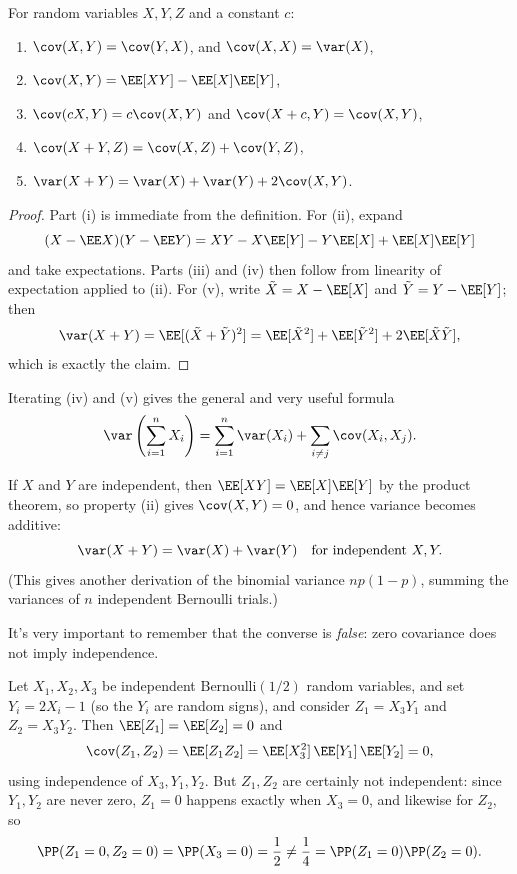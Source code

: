 \begin{proposition}
	For random variables $X, Y, Z$ and a constant $c$:
	\begin{enumerate}[label=(\roman*)]
		\item $\cov(X, Y) = \cov(Y, X)$, and $\cov(X, X) = \var(X)$,
		\item $\cov(X, Y) = \EE[XY] - \EE[X]\EE[Y]$,
		\item $\cov(cX, Y) = c\cov(X, Y)$ and $\cov(X + c, Y) = \cov(X, Y)$,
		\item $\cov(X + Y, Z) = \cov(X, Z) + \cov(Y, Z)$,
		\item $\var(X + Y) = \var(X) + \var(Y) + 2\cov(X, Y)$.
	\end{enumerate}
\end{proposition}
\begin{proof}
	Part (i) is immediate from the definition. For (ii), expand
	$$
	(X - \EE X)(Y - \EE Y) = XY - X \EE[Y] - Y \EE[X] + \EE[X]\EE[Y]
	$$
	and take expectations. Parts (iii) and (iv) then follow from linearity of expectation applied to (ii). For (v), write $\tilde{X} = X - \EE[X]$ and $\tilde{Y} = Y - \EE[Y]$; then
	$$
	\var(X + Y) = \EE[(\tilde X + \tilde Y)^2] = \EE[\tilde X^2] + \EE[\tilde Y^2] + 2\EE[\tilde X \tilde Y],
	$$
	which is exactly the claim.
\end{proof}

Iterating (iv) and (v) gives the general and very useful formula
$$
\var\left(\sum_{i = 1}^{n} X_i\right) = \sum_{i = 1}^{n} \var(X_i) + \sum_{i \neq j} \cov(X_i, X_j).
$$

If $X$ and $Y$ are independent, then $\EE[XY] = \EE[X]\EE[Y]$ by the product theorem, so property (ii) gives $\cov(X, Y) = 0$, and hence variance becomes additive:
$$
\var(X + Y) = \var(X) + \var(Y) \quad \text{for independent } X, Y.
$$
(This gives another derivation of the binomial variance $np(1-p)$, summing the variances of $n$ independent Bernoulli trials.)

It's very important to remember that the converse is \emph{false}: zero covariance does not imply independence.

\begin{example}
	Let $X_1, X_2, X_3$ be independent $\mathrm{Bernoulli}(1/2)$ random variables, and set $Y_i = 2X_i - 1$ (so the $Y_i$ are random signs), and consider $Z_1 = X_3 Y_1$ and $Z_2 = X_3 Y_2$. Then $\EE[Z_1] = \EE[Z_2] = 0$ and
	$$
	\cov(Z_1, Z_2) = \EE[Z_1 Z_2] = \EE[X_3^2]\,\EE[Y_1]\,\EE[Y_2] = 0,
	$$
	using independence of $X_3, Y_1, Y_2$. But $Z_1, Z_2$ are certainly not independent: since $Y_1, Y_2$ are never zero, $Z_1 = 0$ happens exactly when $X_3 = 0$, and likewise for $Z_2$, so
	$$
	\PP(Z_1 = 0, Z_2 = 0) = \PP(X_3 = 0) = \frac{1}{2} \neq \frac{1}{4} = \PP(Z_1 = 0)\PP(Z_2 = 0).
	$$
\end{example}

